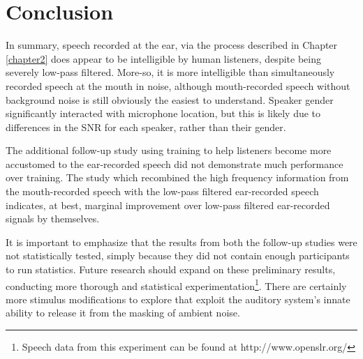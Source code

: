 \section{Conclusion}

In summary, speech recorded at the ear, via the process described in Chapter \ref{chapter2} does appear to be intelligible by human listeners, despite being severely low-pass filtered.  More-so, it is more intelligible than simultaneously recorded speech at the mouth in noise, although mouth-recorded speech without background noise is still obviously the easiest to understand.  Speaker gender significantly interacted with microphone location, but this is likely due to differences in the SNR for each speaker, rather than their gender.  

The additional follow-up study using training to help listeners become more accustomed to the ear-recorded speech did not demonstrate much performance over training.  The study which recombined the high frequency information from the mouth-recorded speech with the low-pass filtered ear-recorded speech indicates, at best, marginal improvement over low-pass filtered ear-recorded signals by themselves.

It is important to emphasize that the results from both the follow-up studies were not statistically tested, simply because they did not contain enough participants to run statistics.  Future research should expand on these preliminary results, conducting more thorough and statistical experimentation\footnote{Speech data from this experiment can be found at http://www.openslr.org/}.  There are certainly more stimulus modifications to explore that exploit the auditory system's innate ability to release it from the masking of ambient noise.

